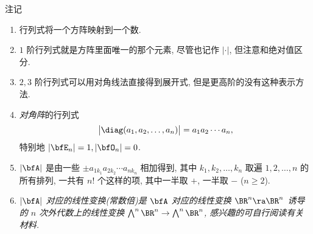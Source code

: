 \begin{frame}{注记}
	\begin{enumerate}
		\item 行列式将一个方阵映射到一个数.
		\item $1$ 阶行列式就是方阵里面唯一的那个元素, 尽管也记作 $|\cdot|$, 但注意和绝对值区分.
		\item $2,3$ 阶行列式可以用对角线法直接得到展开式, 但是更高阶的没有这种表示方法.
		\item \emph{对角阵}的行列式
		\[\bigl|\diag(a_1,a_2,\dots,a_n)\bigr|=a_1a_2\cdots a_n,\]
		特别地 $|\bfE_n|=1,|\bfO_n|=0$.
		\item $|\bfA|$ 是由一些 $\pm a_{1 k_1}a_{2 k_2}\cdots a_{n k_n}$ 相加得到, 其中 $k_1,k_2,\dots,k_n$ 取遍 $1,2,\dots,n$ 的所有排列, 一共有 $n!$ 个这样的项, 其中一半取 $+$, 一半取 $-$ ($n\ge2$).
		\item {\itshape $|\bfA|$ 对应的线性变换(常数倍)是 $\bfA$ 对应的线性变换 $\BR^n\ra\BR^n$ 诱导的 $n$ 次外代数上的线性变换 $\bigwedge^n\BR^n\to\bigwedge^n\BR^n$, 感兴趣的可自行阅读有关材料.}
	\end{enumerate}
\end{frame}




